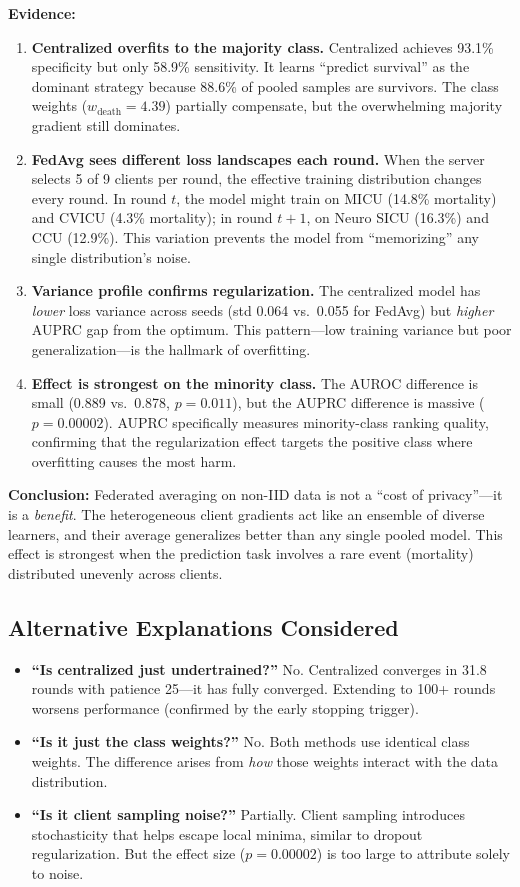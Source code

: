 \documentclass[11pt,a4paper]{report}
\begin{document}
\textbf{Evidence:}
\begin{enumerate}[leftmargin=2em]
\item \textbf{Centralized overfits to the majority class.} Centralized achieves 93.1\% specificity but only 58.9\% sensitivity. It learns ``predict survival'' as the dominant strategy because 88.6\% of pooled samples are survivors. The class weights ($w_\text{death} = 4.39$) partially compensate, but the overwhelming majority gradient still dominates.
\item \textbf{FedAvg sees different loss landscapes each round.} When the server selects 5 of 9 clients per round, the effective training distribution changes every round. In round $t$, the model might train on MICU (14.8\% mortality) and CVICU (4.3\% mortality); in round $t+1$, on Neuro SICU (16.3\%) and CCU (12.9\%). This variation prevents the model from ``memorizing'' any single distribution's noise.
\item \textbf{Variance profile confirms regularization.} The centralized model has \emph{lower} loss variance across seeds (std 0.064 vs.\ 0.055 for FedAvg) but \emph{higher} AUPRC gap from the optimum. This pattern---low training variance but poor generalization---is the hallmark of overfitting.
\item \textbf{Effect is strongest on the minority class.} The AUROC difference is small (0.889 vs.\ 0.878, $p = 0.011$), but the AUPRC difference is massive ($p = 0.00002$). AUPRC specifically measures minority-class ranking quality, confirming that the regularization effect targets the positive class where overfitting causes the most harm.
\end{enumerate}

\textbf{Conclusion:} Federated averaging on non-IID data is not a ``cost of privacy''---it is a \emph{benefit}. The heterogeneous client gradients act like an ensemble of diverse learners, and their average generalizes better than any single pooled model. This effect is strongest when the prediction task involves a rare event (mortality) distributed unevenly across clients.

\subsection{Alternative Explanations Considered}
\begin{itemize}[leftmargin=2em]
\item \textbf{``Is centralized just undertrained?''} No. Centralized converges in 31.8 rounds with patience 25---it has fully converged. Extending to 100+ rounds worsens performance (confirmed by the early stopping trigger).
\item \textbf{``Is it just the class weights?''} No. Both methods use identical class weights. The difference arises from \emph{how} those weights interact with the data distribution.
\item \textbf{``Is it client sampling noise?''} Partially. Client sampling introduces stochasticity that helps escape local minima, similar to dropout regularization. But the effect size ($p = 0.00002$) is too large to attribute solely to noise.
\end{itemize}
\end{document}
